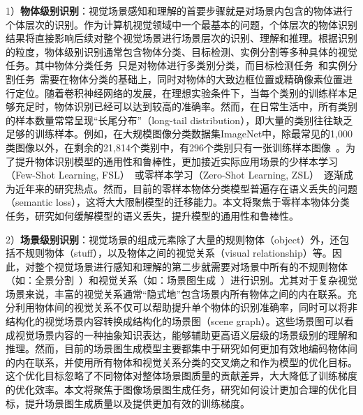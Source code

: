 1）\textbf{物体级别识别}：视觉场景感知和理解的首要步骤就是对场景内包含的物体进行个体层次的识别。作为计算机视觉领域中一个最基本的问题，个体层次的物体识别结果将直接影响后续对整个视觉场景进行场景层次的识别、理解和推理。根据识别的粒度，物体级别识别通常包含物体分类、目标检测、实例分割等多种具体的视觉任务。其中物体分类任务~\cite{russakovsky2015imagenet,krizhevsky2012imagenet,simonyan2015very,szegedy2015going,he2016deep,xie2017aggregated,hu2018squeeze}只是对物体进行多类别分类，而目标检测任务~\cite{ren2015faster,liu2016ssd,redmon2016you}和实例分割任务~\cite{he2017mask}需要在物体分类的基础上，同时对物体的大致边框位置或精确像素位置进行定位。随着卷积神经网络的发展，在理想实验条件下，当每个类别的训练样本足够充足时，物体识别已经可以达到较高的准确率。然而，在日常生活中，所有类别的样本数量常常呈现“长尾分布”（long-tail distribution），即大量的类别往往缺乏足够的训练样本。例如，在大规模图像分类数据集ImageNet中，除最常见的1,000类图像以外，在剩余的21,814个类别中，有296个类别只有一张训练样本图像~\cite{russakovsky2015imagenet}。为了提升物体识别模型的通用性和鲁棒性，更加接近实际应用场景的少样本学习（Few-Shot Learning, FSL）~\cite{fei2006one}或零样本学习（Zero-Shot Learning, ZSL）~\cite{lampert2009learning}逐渐成为近年来的研究热点。然而，目前的零样本物体分类模型普遍存在语义丢失的问题（semantic loss），这将大大限制模型的迁移能力。本文将聚焦于零样本物体分类任务，研究如何缓解模型的语义丢失，提升模型的通用性和鲁棒性。

2）\textbf{场景级别识别}：视觉场景的组成元素除了大量的规则物体（object）外，还包括不规则物体（stuff），以及物体之间的视觉关系（visual relationship）等。因此，对整个视觉场景进行感知和理解的第二步就需要对场景中所有的不规则物体（如：全景分割~\cite{kirillov2019panoptic}）和视觉关系（如：场景图生成~\cite{johnson2015image}）进行识别。尤其对于复杂视觉场景来说，丰富的视觉关系通常“隐式地”包含场景内所有物体之间的内在联系。充分利用物体间的视觉关系不仅可以帮助提升单个物体的识别准确率，同时可以将非结构化的视觉场景内容转换成结构化的场景图（scene graph）。这些场景图可以看成视觉场景内容的一种抽象知识表达，能够辅助更高语义层级的场景级别的理解和推理。然而，目前的场景图生成模型主要都集中于研究如何更加有效地编码物体间的内在联系，并使用所有物体和视觉关系分类的交叉熵之和作为模型的优化目标。这个优化目标忽略了不同物体对整体场景图质量的贡献差异，大大降低了训练梯度的优化效率。本文将聚焦于图像场景图生成任务，研究如何设计更加合理的优化目标，提升场景图生成质量以及提供更加有效的训练梯度。

